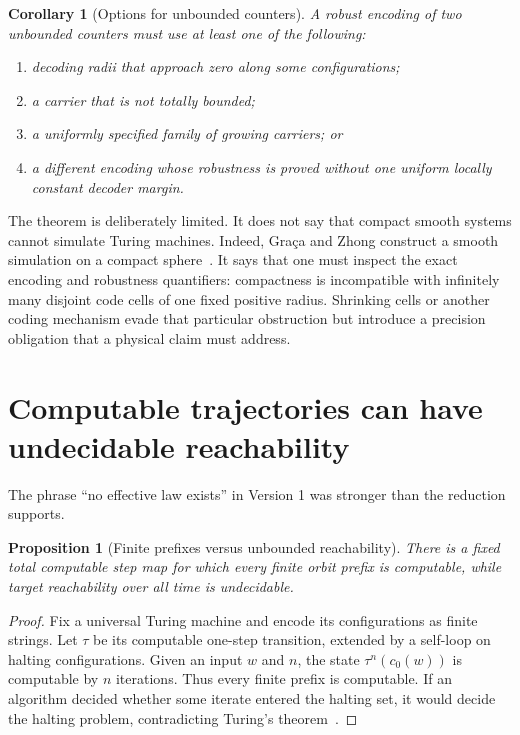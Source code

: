 \documentclass[11pt]{article}
\newtheorem{proposition}[theorem]{Proposition}
\newtheorem{corollary}[theorem]{Corollary}
\theoremstyle{definition}
\theoremstyle{remark}
\begin{document}
\begin{corollary}[Options for unbounded counters]\label{cor:options}
A robust encoding of two unbounded counters must use at least one of the
following:
\begin{enumerate}[label=(\roman*)]
\item decoding radii that approach zero along some configurations;
\item a carrier that is not totally bounded;
\item a uniformly specified family of growing carriers; or
\item a different encoding whose robustness is proved without one uniform
locally constant decoder margin.
\end{enumerate}
\end{corollary}

The theorem is deliberately limited.  It does not say that compact smooth
systems cannot simulate Turing machines.  Indeed, Gra\c{c}a and Zhong construct
a smooth simulation on a compact sphere~\cite{GracaZhong2023}.  It says that
one must inspect the exact encoding and robustness quantifiers: compactness is
incompatible with infinitely many disjoint code cells of one fixed positive
radius.  Shrinking cells or another coding mechanism evade that particular
obstruction but introduce a precision obligation that a physical claim must
address.

\section{Computable trajectories can have undecidable reachability}

The phrase ``no effective law exists'' in Version 1 was stronger than the
reduction supports.

\begin{proposition}[Finite prefixes versus unbounded reachability]
\label{prop:prefix}
There is a fixed total computable step map for which every finite orbit prefix
is computable, while target reachability over all time is undecidable.
\end{proposition}

\begin{proof}
Fix a universal Turing machine and encode its configurations as finite strings.
Let \(\tau\) be its computable one-step transition, extended by a self-loop on
halting configurations.  Given an input \(w\) and \(n\), the state
\(\tau^n(c_0(w))\) is computable by \(n\) iterations.  Thus every finite prefix
is computable.  If an algorithm decided whether some iterate entered the
halting set, it would decide the halting problem, contradicting
Turing's theorem~\cite{Turing1937}.
\end{proof}
\end{document}

